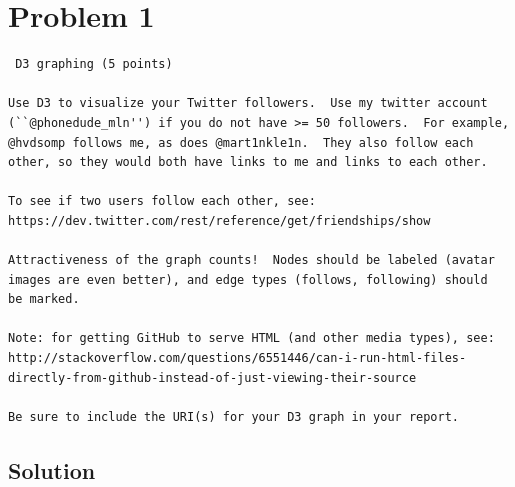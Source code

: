  
\section{Problem 1}
\label{part1}
\begin{verbatim}
 D3 graphing (5 points)

Use D3 to visualize your Twitter followers.  Use my twitter account
(``@phonedude_mln'') if you do not have >= 50 followers.  For example,
@hvdsomp follows me, as does @mart1nkle1n.  They also follow each
other, so they would both have links to me and links to each other.

To see if two users follow each other, see:
https://dev.twitter.com/rest/reference/get/friendships/show

Attractiveness of the graph counts!  Nodes should be labeled (avatar
images are even better), and edge types (follows, following) should
be marked.

Note: for getting GitHub to serve HTML (and other media types), see:
http://stackoverflow.com/questions/6551446/can-i-run-html-files-directly-from-github-instead-of-just-viewing-their-source

Be sure to include the URI(s) for your D3 graph in your report. 
\end{verbatim}

\subsection{Solution}

